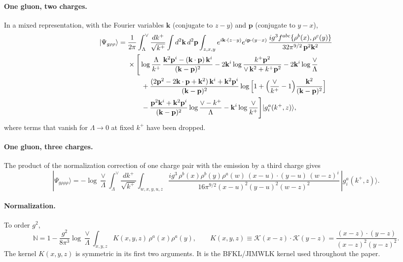 \documentclass[aps,prd,onecolumn,superscriptaddress,nofootinbib,floatfix,longbibliography,11pt]{revtex4-2}
\numberwithin{equation}{section}
\newcommand{\KK}{\mathcal{K}}
\def\mf#1{\mathbb{#1}}
\begin{document}
\paragraph*{One gluon, two charges.} In a mixed representation, with the Fourier variables $\mathbf k$ (conjugate to $z-y$) and $\mathbf p$ (conjugate to $y-x$),
\begin{align}
|\Psi_{g\rho\rho}\rangle={}&\frac{1}{2\pi}\int_{\Lambda}^{\vee}\frac{dk^+}{\sqrt{k^+}}\int d^2\mathbf k\,d^2\mathbf p\int_{z,x,y}e^{i\mathbf k\cdot(z-y)}e^{i\mathbf p\cdot(y-x)}\,\frac{ig^3f^{abc}\{\rho^b(x),\rho^c(y)\}}{32\pi^{9/2}\,\mathbf p^2\mathbf k^2}\notag\\
&\times\Bigg[\log\frac{\Lambda}{k^+}\,\frac{\mathbf k^2\mathbf p^i-(\mathbf k\cdot\mathbf p)\,\mathbf k^i}{(\mathbf k-\mathbf p)^2}-2\mathbf k^i\log\frac{k^+\mathbf p^2}{\vee\,\mathbf k^2+k^+\mathbf p^2}-2\mathbf k^i\log\frac{\vee}{\Lambda}\notag\\
&\qquad+\frac{(2\mathbf p^2-2\mathbf k\cdot\mathbf p+\mathbf k^2)\,\mathbf k^i+\mathbf k^2\mathbf p^i}{(\mathbf k-\mathbf p)^2}\log\Big[1+\Big(\frac{\vee}{k^+}-1\Big)\frac{\mathbf k^2}{(\mathbf k-\mathbf p)^2}\Big]\notag\\
&\qquad-\frac{\mathbf p^2\mathbf k^i+\mathbf k^2\mathbf p^i}{(\mathbf k-\mathbf p)^2}\log\frac{\vee-k^+}{\Lambda}-\mathbf k^i\log\frac{\vee}{k^+}\Bigg]|g^a_i(k^+,z)\rangle ,
\label{eq:grhorho}
\end{align}
where terms that vanish for $\Lambda\to0$ at fixed $k^+$ have been dropped.

\paragraph*{One gluon, three charges.} The product of the normalization correction of one charge pair with the emission by a third charge gives
\begin{equation}
|\Psi_{g\rho\rho\rho}\rangle=-\log\frac{\vee}{\Lambda}\int_{\Lambda}^{\vee}\frac{dk^+}{\sqrt{k^+}}\int_{w,x,y,u,z}\frac{ig^3\,\rho^b(x)\rho^b(y)\rho^a(w)\,(x-u)\cdot(y-u)\,(w-z)^i}{16\pi^{9/2}(x-u)^2(y-u)^2(w-z)^2}\,|g^a_i(k^+,z)\rangle .
\label{eq:grhorhorho}
\end{equation}

\paragraph*{Normalization.} To order $g^2$,
\begin{equation}
\mf N=1-\frac{g^2}{8\pi^3}\log\frac{\vee}{\Lambda}\int_{x,y,z}K(x,y,z)\,\rho^a(x)\rho^a(y),\qquad K(x,y,z)\equiv\KK(x-z)\cdot\KK(y-z)=\frac{(x-z)\cdot(y-z)}{(x-z)^2(y-z)^2}.
\label{eq:NX}
\end{equation}
The kernel $K(x,y,z)$ is symmetric in its first two arguments. It is the BFKL/JIMWLK kernel used throughout the paper.
\end{document}
